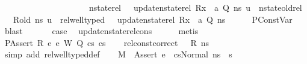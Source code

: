 \begin{isabellebody}
\ \ \ \ \ \ \ \ \ \ \ \ \ \ \ \ \ \ \ \ \ nstate{\isacharunderscore}{\kern0pt}rel\ {\isasymLambda}\ {\isasymLambda}{\isacharprime}{\kern0pt}\ {\isacharparenleft}{\kern0pt}update{\isacharunderscore}{\kern0pt}nstate{\isacharunderscore}{\kern0pt}rel\ {\isacharparenleft}{\kern0pt}R{\isacharparenleft}{\kern0pt}x{}\ {\isasymmapsto}\ a{\isacharparenright}{\kern0pt}{\isacharparenright}{\kern0pt}\ Q{\isacharparenright}{\kern0pt}\ ns{\isacharprime}{\kern0pt}\ u\ {\isasymand}\ nstate{\isacharunderscore}{\kern0pt}old{\isacharunderscore}{\kern0pt}rel\ {\isasymLambda}\ {\isasymLambda}{\isacharprime}{\kern0pt}\ R{\isacharunderscore}{\kern0pt}old\ ns{\isacharprime}{\kern0pt}\ u\ {\isasymand}\ rel{\isacharunderscore}{\kern0pt}well{\isacharunderscore}{\kern0pt}typed\ {\isasymLambda}\ {\isasymOmega}\ {\isacharparenleft}{\kern0pt}update{\isacharunderscore}{\kern0pt}nstate{\isacharunderscore}{\kern0pt}rel\ {\isacharparenleft}{\kern0pt}R{\isacharparenleft}{\kern0pt}x{}\ {\isasymmapsto}\ a{\isacharparenright}{\kern0pt}{\isacharparenright}{\kern0pt}\ Q{\isacharparenright}{\kern0pt}\ ns{\isacharprime}{\kern0pt}{\isacharparenright}{\kern0pt}{\isacharparenright}{\kern0pt}{\isachardoublequoteclose}\isanewline
\ \ \ \ \isamarkupfalse%
\ PConstVar\ \isamarkupfalse%
\ blast\ \isanewline
\ \ \isamarkupfalse%
\ \isamarkupfalse%
\ {\isacharquery}{\kern0pt}case\ \isamarkupfalse%
\ update{\isacharunderscore}{\kern0pt}nstate{\isacharunderscore}{\kern0pt}rel{\isacharunderscore}{\kern0pt}cons\isanewline
\ \ \ \ \isamarkupfalse%
\ metis\isanewline
{}\isamarkupfalse%
\isanewline
\ \ \isamarkupfalse%
\ {\isacharparenleft}{\kern0pt}PAssert\ R\ e{}\ e{}\ W\ Q\ cs{}\ cs{}{\isacharparenright}{\kern0pt}\isanewline
\ \ \isamarkupfalse%
\ {\isachardoublequoteopen}rel{\isacharunderscore}{\kern0pt}const{\isacharunderscore}{\kern0pt}correct\ {\isasymLambda}\ {\isasymOmega}\ R\ ns{\isachardoublequoteclose}\ \isamarkupfalse%
\ {\isacharparenleft}{\kern0pt}simp\ add{\isacharcolon}{\kern0pt}\ rel{\isacharunderscore}{\kern0pt}well{\isacharunderscore}{\kern0pt}typed{\isacharunderscore}{\kern0pt}def{\isacharparenright}{\kern0pt}\isanewline
\ \ \isamarkupfalse%
\ {\isacartoucheopen}M{\isacharcomma}{\kern0pt}{\isasymLambda}{\isacharcomma}{\kern0pt}{\isasymGamma}{\isacharcomma}{\kern0pt}{\isasymOmega}\ {\isasymturnstile}\ {\isasymlangle}Assert\ e{}\ {\isacharhash}{\kern0pt}\ cs{}{\isacharcomma}{\kern0pt}Normal\ ns{\isasymrangle}\ {\isacharbrackleft}{\kern0pt}{\isasymrightarrow}{\isacharbrackright}{\kern0pt}\ s{\isacharprime}{\kern0pt}{\isacartoucheclose}\ \isamarkupfalse%

\end{isabellebody}
